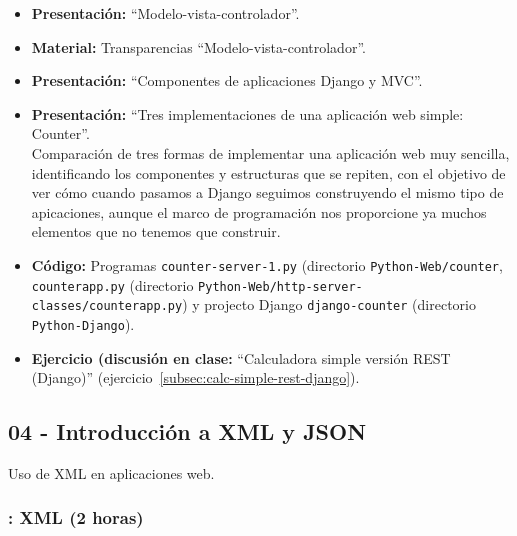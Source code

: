 \documentclass[a4paper,12pt]{article}
\begin{document}
\begin{itemize}
\item \textbf{Presentación:} ``Modelo-vista-controlador''.
\item \textbf{Material:} Transparencias ``Modelo-vista-controlador''.
\item \textbf{Presentación:} ``Componentes de aplicaciones Django y MVC''.

\item \textbf{Presentación:} ``Tres implementaciones de una aplicación web simple: Counter''. \\
  Comparación de tres formas de implementar una aplicación web muy sencilla, identificando los componentes y estructuras que se repiten, con el objetivo de ver cómo cuando pasamos a Django seguimos construyendo el mismo tipo de apicaciones, aunque el marco de programación nos proporcione ya muchos elementos que no tenemos que construir.
\item \textbf{Código:} Programas \verb|counter-server-1.py| (directorio \verb|Python-Web/counter|, \verb|counterapp.py| (directorio \verb|Python-Web/http-server-classes/counterapp.py|) y projecto Django \verb|django-counter| (directorio \verb|Python-Django|).


\item \textbf{Ejercicio (discusión en clase:} ``Calculadora simple versión REST (Django)'' (ejercicio~\ref{subsec:calc-simple-rest-django}). \\
%

\end{itemize}


\subsection{04 - Introducción a XML y JSON}

Uso de XML en aplicaciones web.

\subsubsection{\martesI: XML (2 horas)}
\label{cal:martesI}
\end{document}
